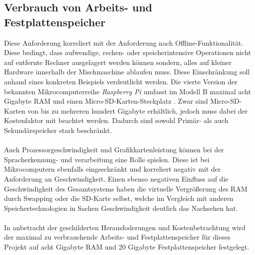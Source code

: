 \subsection{Verbrauch von Arbeits- und Festplattenspeicher}
Diese Anforderung korreliert mit der Anforderung nach Offline-Funktionalität. Diese bedingt, dass aufwendige, rechen- oder speicherintensive Operationen nicht auf entfernte Rechner ausgelagert werden können sondern, alles auf \glqq{}kleiner\grqq{} Hardware innerhalb der Mischmaschine ablaufen muss. Diese Einschränkung soll anhand eines konkreten Beispiels verdeutlicht werden. Die vierte Version der bekannten Mikrocomputerreihe \textit{Raspberry Pi} umfasst im Modell B maximal acht Gigabyte \ac{RAM} und einen Micro-SD-Karten-Steckplatz \cite{ltd_raspberry_nodate}. Zwar sind Micro-SD-Karten von bis zu mehreren hundert Gigabyte erhältlich, jedoch muss dabei der Kostenfaktor mit beachtet werden. Dadurch sind sowohl Primär- als auch Sekundärspeicher stark beschränkt.\\\\
Auch Prozessorgeschwindigkeit und Grafikkartenleistung können bei der Spracherkennung- und verarbeitung eine Rolle spielen. Diese ist bei Mikrocomputern ebenfalls eingeschränkt und korreliert negativ mit der Anforderung an Geschwindigkeit. Einen ebenso negativen Einfluss auf die Geschwindigkeit des Gesamtsystems haben die virtuelle Vergrößerung des \ac{RAM} durch Swapping oder die SD-Karte selbst, welche im Vergleich mit anderen Speichertechnologien in Sachen Geschwindigkeit deutlich das Nachsehen hat.\\\\
In anbetracht der geschilderten Herausfoderungen und Kostenbetrachtung wird der maximal zu verbrauchende Arbeits- und Festplattenspeicher für dieses Projekt auf acht Gigabyte \ac{RAM} und 20 Gigabyte Festplattenspeicher festgelegt.
\endinput